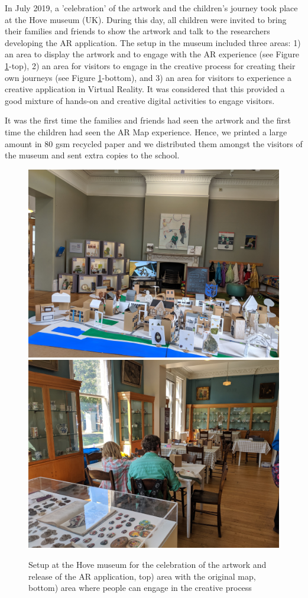 \documentclass[acmlarge,screen,dvipsnames]{acmart}
\begin{document}
In July 2019, a 'celebration' of the artwork and the children's journey took
place at the Hove museum (UK). During this day, all children were invited to
bring their families and friends to show the artwork and talk to the
researchers developing the AR application. The setup in the museum included
three areas: 1) an area to display the artwork and to engage with the AR
experience (see Figure \ref{fig:museum}-top), 2) an area for visitors to
engage in the creative process for creating their own journeys (see Figure
\ref{fig:museum}-bottom), and 3) an area for visitors to experience a creative
application in Virtual Reality. It was considered that this provided a good mixture
of hands-on and creative digital activities to engage visitors.

It was the first time the families and friends had seen the artwork and the
first time the children had seen the AR Map experience. Hence, we printed a
large amount in 80 gsm recycled paper and we distributed them amongst the
visitors of the museum and sent extra copies to the school.

\begin{figure}[ht] \centering
\includegraphics[width=0.6\linewidth]{images/IMG_20190720_103105.jpg}
\includegraphics[width=0.6\linewidth]{images/IMG_20190720_151644.jpg}
\caption{Setup at the Hove museum for the celebration of the artwork and
release of the AR application, top) area with the original map, bottom) area
where people can engage in the creative process} \label{fig:museum}
\end{figure}
 
\end{document}
